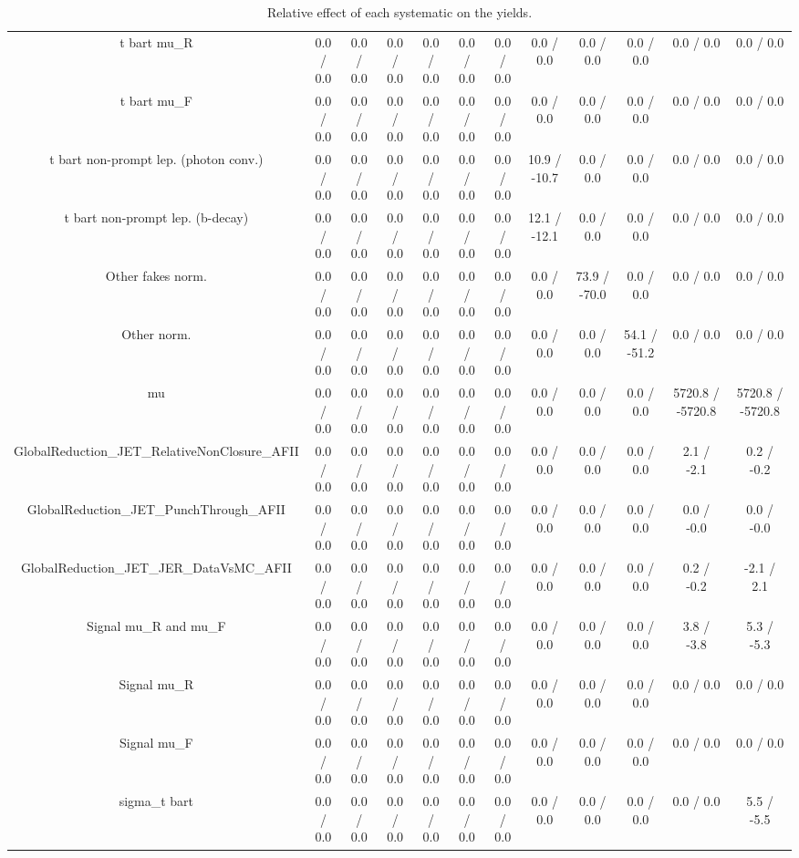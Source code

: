 \begin{table}[htbp]
\begin{center}
\begin{tabular}{|c|c|c|c|c|c|c|c|c|c|c|c|}
  t bar{t}  mu_{R} & 0.0 / 0.0 & 0.0 / 0.0 & 0.0 / 0.0 & 0.0 / 0.0 & 0.0 / 0.0 & 0.0 / 0.0 & 0.0 / 0.0 & 0.0 / 0.0 & 0.0 / 0.0 & 0.0 / 0.0 & 0.0 / 0.0 \\ 
  t bar{t}  mu_{F} & 0.0 / 0.0 & 0.0 / 0.0 & 0.0 / 0.0 & 0.0 / 0.0 & 0.0 / 0.0 & 0.0 / 0.0 & 0.0 / 0.0 & 0.0 / 0.0 & 0.0 / 0.0 & 0.0 / 0.0 & 0.0 / 0.0 \\ 
  t bar{t} non-prompt lep. (photon conv.) & 0.0 / 0.0 & 0.0 / 0.0 & 0.0 / 0.0 & 0.0 / 0.0 & 0.0 / 0.0 & 0.0 / 0.0 & 10.9 / -10.7 & 0.0 / 0.0 & 0.0 / 0.0 & 0.0 / 0.0 & 0.0 / 0.0 \\ 
  t bar{t} non-prompt lep. (b-decay) & 0.0 / 0.0 & 0.0 / 0.0 & 0.0 / 0.0 & 0.0 / 0.0 & 0.0 / 0.0 & 0.0 / 0.0 & 12.1 / -12.1 & 0.0 / 0.0 & 0.0 / 0.0 & 0.0 / 0.0 & 0.0 / 0.0 \\ 
  Other fakes norm. & 0.0 / 0.0 & 0.0 / 0.0 & 0.0 / 0.0 & 0.0 / 0.0 & 0.0 / 0.0 & 0.0 / 0.0 & 0.0 / 0.0 & 73.9 / -70.0 & 0.0 / 0.0 & 0.0 / 0.0 & 0.0 / 0.0 \\ 
  Other norm. & 0.0 / 0.0 & 0.0 / 0.0 & 0.0 / 0.0 & 0.0 / 0.0 & 0.0 / 0.0 & 0.0 / 0.0 & 0.0 / 0.0 & 0.0 / 0.0 & 54.1 / -51.2 & 0.0 / 0.0 & 0.0 / 0.0 \\ 
  mu & 0.0 / 0.0 & 0.0 / 0.0 & 0.0 / 0.0 & 0.0 / 0.0 & 0.0 / 0.0 & 0.0 / 0.0 & 0.0 / 0.0 & 0.0 / 0.0 & 0.0 / 0.0 & 5720.8 / -5720.8 & 5720.8 / -5720.8 \\ 
  GlobalReduction_JET_RelativeNonClosure_AFII & 0.0 / 0.0 & 0.0 / 0.0 & 0.0 / 0.0 & 0.0 / 0.0 & 0.0 / 0.0 & 0.0 / 0.0 & 0.0 / 0.0 & 0.0 / 0.0 & 0.0 / 0.0 & 2.1 / -2.1 & 0.2 / -0.2 \\ 
  GlobalReduction_JET_PunchThrough_AFII & 0.0 / 0.0 & 0.0 / 0.0 & 0.0 / 0.0 & 0.0 / 0.0 & 0.0 / 0.0 & 0.0 / 0.0 & 0.0 / 0.0 & 0.0 / 0.0 & 0.0 / 0.0 & 0.0 / -0.0 & 0.0 / -0.0 \\ 
  GlobalReduction_JET_JER_DataVsMC_AFII & 0.0 / 0.0 & 0.0 / 0.0 & 0.0 / 0.0 & 0.0 / 0.0 & 0.0 / 0.0 & 0.0 / 0.0 & 0.0 / 0.0 & 0.0 / 0.0 & 0.0 / 0.0 & 0.2 / -0.2 & -2.1 / 2.1 \\ 
  Signal  mu_{R} and  mu_{F} & 0.0 / 0.0 & 0.0 / 0.0 & 0.0 / 0.0 & 0.0 / 0.0 & 0.0 / 0.0 & 0.0 / 0.0 & 0.0 / 0.0 & 0.0 / 0.0 & 0.0 / 0.0 & 3.8 / -3.8 & 5.3 / -5.3 \\ 
  Signal  mu_{R} & 0.0 / 0.0 & 0.0 / 0.0 & 0.0 / 0.0 & 0.0 / 0.0 & 0.0 / 0.0 & 0.0 / 0.0 & 0.0 / 0.0 & 0.0 / 0.0 & 0.0 / 0.0 & 0.0 / 0.0 & 0.0 / 0.0 \\ 
  Signal  mu_{F} & 0.0 / 0.0 & 0.0 / 0.0 & 0.0 / 0.0 & 0.0 / 0.0 & 0.0 / 0.0 & 0.0 / 0.0 & 0.0 / 0.0 & 0.0 / 0.0 & 0.0 / 0.0 & 0.0 / 0.0 & 0.0 / 0.0 \\ 
   sigma_{t bar{t}} & 0.0 / 0.0 & 0.0 / 0.0 & 0.0 / 0.0 & 0.0 / 0.0 & 0.0 / 0.0 & 0.0 / 0.0 & 0.0 / 0.0 & 0.0 / 0.0 & 0.0 / 0.0 & 0.0 / 0.0 & 5.5 / -5.5 \\ 
\hline 
\end{tabular} 
\caption{Relative effect of each systematic on the yields.} 
\end{center} 
\end{table} 

